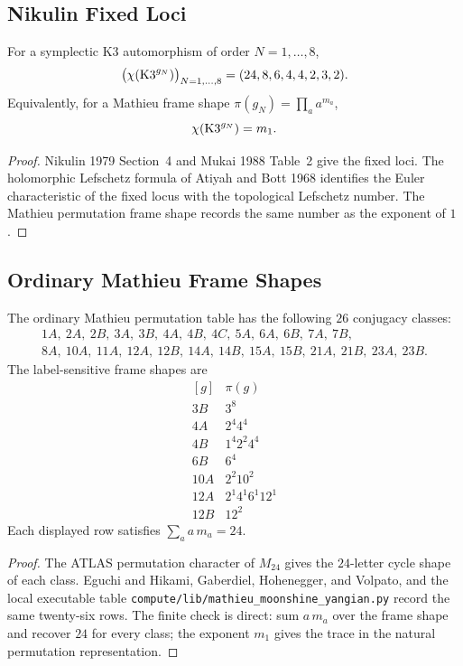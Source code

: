 \subsection*{Nikulin Fixed Loci}

\begin{theorem}
\label{wn:thm:mukai-nikulin-fixed-point-counts}
For a symplectic K3 automorphism of order $N=1,\ldots,8$,
\[
  \bigl(\chi(\mathrm{K3}^{g_N})\bigr)_{N=1,\ldots,8}
    =(24,8,6,4,4,2,3,2).
\]
Equivalently, for a Mathieu frame shape $\pi(g_N)=\prod_a a^{m_a}$,
\[
  \chi(\mathrm{K3}^{g_N})=m_1.
\]
\end{theorem}
\begin{proof}
Nikulin 1979 Section~4 and Mukai 1988 Table~2 give the fixed loci.
The holomorphic Lefschetz formula of Atiyah and Bott 1968 identifies
the Euler characteristic of the fixed locus with the topological
Lefschetz number.  The Mathieu permutation frame shape records the same
number as the exponent of $1$.
\end{proof}

\subsection*{Ordinary Mathieu Frame Shapes}

\begin{theorem}
\label{wn:thm:ordinary-mathieu-frame-shapes}
The ordinary Mathieu permutation table has the following $26$ conjugacy
classes:
\[
\begin{gathered}
1A,\ 2A,\ 2B,\ 3A,\ 3B,\ 4A,\ 4B,\ 4C,\ 5A,\ 6A,\ 6B,\ 7A,\ 7B,\\
8A,\ 10A,\ 11A,\ 12A,\ 12B,\ 14A,\ 14B,\ 15A,\ 15B,\ 21A,\ 21B,\ 23A,\ 23B.
\end{gathered}
\]
The label-sensitive frame shapes are
\[
\begin{array}{c|c}
[g] & \pi(g)\\
\hline
3B & 3^8\\
4A & 2^4 4^4\\
4B & 1^4 2^2 4^4\\
6B & 6^4\\
10A & 2^2 10^2\\
12A & 2^1 4^1 6^1 12^1\\
12B & 12^2
\end{array}
\]
Each displayed row satisfies $\sum_a a\,m_a=24$.
\end{theorem}
\begin{proof}
The ATLAS permutation character of $M_{24}$ gives the $24$-letter cycle
shape of each class.  Eguchi and Hikami, Gaberdiel, Hohenegger, and
Volpato, and the local executable table
\texttt{compute/lib/mathieu\_moonshine\_yangian.py} record the same
twenty-six rows.  The finite check is direct: sum $a\,m_a$ over the
frame shape and recover $24$ for every class; the exponent $m_1$ gives
the trace in the natural permutation representation.
\end{proof}

